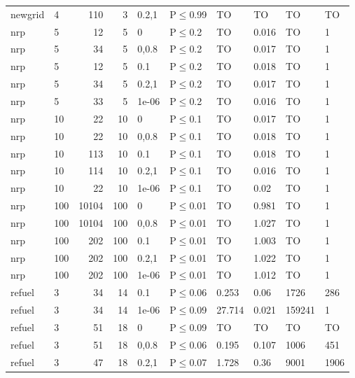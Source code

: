 \begin{longtable}{llrrllllll}
 newgrid       & 4         &    	110 &   3 & 0.2,1 & P$\leq$0.99  & TO       & TO       & TO      & TO      \\
 nrp           & 5         &     	12 &   5 & 0     & P$\leq$0.2   & TO       & 0.016    & TO      & 1       \\
 nrp           & 5         &     	34 &   5 & 0,0.8 & P$\leq$0.2   & TO       & 0.017    & TO      & 1       \\
 nrp           & 5         &     	12 &   5 & 0.1   & P$\leq$0.2   & TO       & 0.018    & TO      & 1       \\
 nrp           & 5         &     	34 &   5 & 0.2,1 & P$\leq$0.2   & TO       & 0.017    & TO      & 1       \\
 nrp           & 5         &     	33 &   5 & 1e-06 & P$\leq$0.2   & TO       & 0.016    & TO      & 1       \\
 nrp           & 10        &     	22 &  10 & 0     & P$\leq$0.1   & TO       & 0.017    & TO      & 1       \\
 nrp           & 10        &     	22 &  10 & 0,0.8 & P$\leq$0.1   & TO       & 0.018    & TO      & 1       \\
 nrp           & 10        &    	113 &  10 & 0.1   & P$\leq$0.1   & TO       & 0.018    & TO      & 1       \\
 nrp           & 10        &    	114 &  10 & 0.2,1 & P$\leq$0.1   & TO       & 0.016    & TO      & 1       \\
 nrp           & 10        &     	22 &  10 & 1e-06 & P$\leq$0.1   & TO       & 0.02     & TO      & 1       \\
 nrp           & 100       &  	10104 & 100 & 0     & P$\leq$0.01  & TO       & 0.981    & TO      & 1       \\
 nrp           & 100       &  	10104 & 100 & 0,0.8 & P$\leq$0.01  & TO       & 1.027    & TO      & 1       \\
 nrp           & 100       &    	202 & 100 & 0.1   & P$\leq$0.01  & TO       & 1.003    & TO      & 1       \\
 nrp           & 100       &    	202 & 100 & 0.2,1 & P$\leq$0.01  & TO       & 1.022    & TO      & 1       \\
 nrp           & 100       &    	202 & 100 & 1e-06 & P$\leq$0.01  & TO       & 1.012    & TO      & 1       \\
 refuel        & 3         &     	34 &  14 & 0.1   & P$\leq$0.06  & 0.253    & 0.06     & 1726    & 286     \\
 refuel        & 3         &     	34 &  14 & 1e-06 & P$\leq$0.09  & 27.714   & 0.021    & 159241  & 1       \\
 refuel        & 3         &     	51 &  18 & 0     & P$\leq$0.09  & TO       & TO       & TO      & TO      \\
 refuel        & 3         &     	51 &  18 & 0,0.8 & P$\leq$0.06  & 0.195    & 0.107    & 1006    & 451     \\
 refuel        & 3         &     	47 &  18 & 0.2,1 & P$\leq$0.07  & 1.728    & 0.36     & 9001    & 1906    \\
\bottomrule
\end{longtable}
